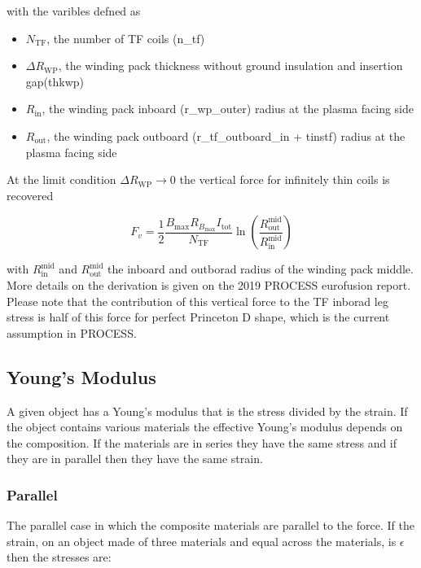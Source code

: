 \documentclass[hidelinks]{article}
\numberwithin{equation}{section}
\begin{document}
    \noi with the varibles defned as 
    \begin{itemize}
        \item $N_\mathrm{TF}$, the number of TF coils (n\_tf)
        \item $\Delta R_\mathrm{WP}$, the winding pack thickness without ground insulation and
              insertion gap(thkwp)
        \item $R_\mathrm{in}$, the winding pack inboard (r\_wp\_outer) radius at the plasma facing side
        \item $R_\mathrm{out}$, the winding pack outboard (r\_tf\_outboard\_in + tinstf) radius at the plasma facing side 
    \end{itemize}

    \noi At the limit condition $\Delta R_\mathrm{WP} \rightarrow 0$ the vertical force for infinitely 
    thin coils is recovered
    
    \begin{equation}
        F_v = \frac{1}{2} \frac{B_\text{max}R_{B_\mathrm{max}} I_\mathrm{tot}}{N_\mathrm{TF}}\ln\left(\frac{R_\mathrm{out}^\mathrm{mid}}{R_\mathrm{in}^\mathrm{mid}}\right)
    \end{equation}
    
    \noi with $R_\mathrm{in}^\mathrm{mid}$ and $R_\mathrm{out}^\mathrm{mid}$ the inboard 
    and outborad radius of the winding pack middle. More details on the derivation 
    is given on the 2019 PROCESS eurofusion report. Please note that the contribution
    of this vertical force to the TF inborad leg stress is half of this force for perfect
    Princeton D shape, which is the current assumption in PROCESS. 

    \subsection{Young's Modulus}

    A given object has a Young's modulus that is the stress divided by the strain. If 
    the object contains various materials the effective Young's modulus depends on the 
    composition. If the materials are in series they have the same stress and if they 
    are in parallel then they have the same strain.

    \subsubsection{Parallel}

    The parallel case in which the composite materials are parallel to the force. If the 
    strain, on an object made of three materials and equal across the materials, is 
    $\epsilon$ then the stresses are:
\end{document}
